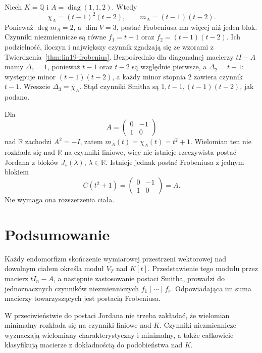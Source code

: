 \begin{przyklad}
\label{prz:lin19-diagonal}
Niech \(K=\mathbb Q\) i
\(A=\operatorname{diag}(1,1,2)\).
Wtedy
\[
 \chi_A=(t-1)^2(t-2),\qquad
 m_A=(t-1)(t-2).
\]
Ponieważ \(\deg m_A=2\),
a \(\dim V=3\), postać Frobeniusa
ma więcej niż jeden blok.
Czynniki niezmiennicze
są równe
\(f_1=t-1\) oraz
\(f_2=(t-1)(t-2)\).
Ich podzielność, iloczyn
i największy czynnik zgadzają się
ze wzorami z
Twierdzenia~\ref{thm:lin19-frobenius}.
Bezpośrednio dla diagonalnej
macierzy \(tI-A\)
mamy \(\Delta_1=1\), ponieważ
\(t-1\) oraz \(t-2\) są względnie pierwsze,
a \(\Delta_2=t-1\):
występuje minor \((t-1)(t-2)\),
a każdy minor stopnia \(2\)
zawiera czynnik \(t-1\).
Wreszcie \(\Delta_3=\chi_A\).
Stąd czynniki Smitha są
\(1,t-1,(t-1)(t-2)\), jak podano.
\end{przyklad}

\begin{przyklad}
\label{prz:lin19-real-rotation}
Dla
\[
 A=\begin{pmatrix}0&-1\\1&0\end{pmatrix}
\]
nad \(\mathbb R\) zachodzi
\(A^2=-I\), zatem
\(m_A(t)=\chi_A(t)=t^2+1\).
Wielomian ten nie rozkłada się
nad \(\mathbb R\) na czynniki liniowe,
więc nie istnieje rzeczywista postać Jordana
z bloków \(J_s(\lambda)\), \(\lambda\in\mathbb R\).
Istnieje jednak postać Frobeniusa
z jednym blokiem
\[
 C(t^2+1)=\begin{pmatrix}0&-1\\1&0\end{pmatrix}=A.
\]
Nie wymaga ona rozszerzenia ciała.
\end{przyklad}

\section{Podsumowanie}
\label{sec:lin19-summary}

Każdy endomorfizm skończenie wymiarowej
przestrzeni wektorowej nad dowolnym ciałem
określa moduł \(V_T\) nad \(K[t]\).
Przedstawienie tego modułu przez
macierz \(tI_n-A\), a następnie
zastosowanie postaci Smitha,
prowadzi do jednoznacznych czynników
niezmienniczych
\(f_1\mid\cdots\mid f_r\).
Odpowiadająca im suma macierzy
towarzyszących jest postacią Frobeniusa.

W przeciwieństwie do postaci Jordana
nie trzeba zakładać, że wielomian minimalny
rozkłada się na czynniki liniowe nad \(K\).
Czynniki niezmiennicze wyznaczają
wielomiany charakterystyczny i minimalny,
a także całkowicie klasyfikują macierze
z dokładnością do podobieństwa nad \(K\).
